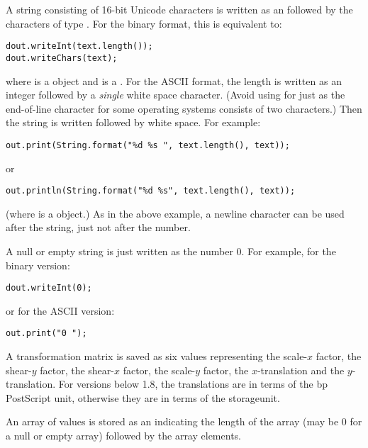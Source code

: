 \begin{deflist}
\begin{itemdesc}
A string consisting of  16-bit Unicode characters is written
as an  followed by the  characters of type
. For the binary format, this is equivalent to:
\begin{verbatim}
dout.writeInt(text.length());
dout.writeChars(text);
\end{verbatim}
where  is a  object
and  is a . For the ASCII format,
the length is written as an integer followed by a \emph{single}
white space character. (Avoid using  for just  as the
end-of-line character for some operating systems consists of two
characters.) Then the string is written followed by white space.
For example:
\begin{verbatim}
out.print(String.format("%d %s ", text.length(), text));
\end{verbatim}
or
\begin{verbatim}
out.println(String.format("%d %s", text.length(), text));
\end{verbatim}
(where  is a  object.)
As in the above example, a newline character can be used after the
string, just not after the number.

A null or empty string is just written as the number 0. For example,
for the binary version:
\begin{verbatim}
dout.writeInt(0);
\end{verbatim}
or for the ASCII version:
\begin{verbatim}
out.print("0 ");
\end{verbatim}
\end{itemdesc}

\begin{itemdesc}
A transformation matrix is saved as six  values
representing the scale-$x$ factor, the shear-$y$
factor, the shear-$x$ factor, the scale-$y$
factor, the $x$-translation and the
$y$-translation. For versions below 1.8, the translations
are in terms of the \gls{bp} PostScript unit, otherwise they are in
terms of the \gls{storageunit}.
\end{itemdesc}

\begin{itemdesc}
An array of  values is stored as an 
 indicating the length of the array (may be 0 for a null or empty
array) followed by the   array elements.
\end{itemdesc}


\end{deflist}
